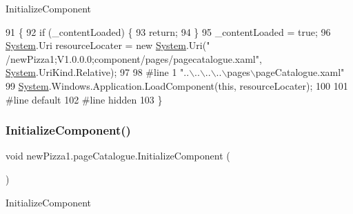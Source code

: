Initialize\+Component 


\begin{DoxyCode}
91                                           \{
92             \textcolor{keywordflow}{if} (\_contentLoaded) \{
93                 \textcolor{keywordflow}{return};
94             \}
95             \_contentLoaded = \textcolor{keyword}{true};
96             \hyperlink{namespaceSystem}{System}.Uri resourceLocater = \textcolor{keyword}{new} \hyperlink{namespaceSystem}{System}.Uri(\textcolor{stringliteral}{"
      /newPizza1;V1.0.0.0;component/pages/pagecatalogue.xaml"}, \hyperlink{namespaceSystem}{System}.UriKind.Relative);
97             
98 \textcolor{preprocessor}{            #line 1 "..\(\backslash\)..\(\backslash\)..\(\backslash\)..\(\backslash\)pages\(\backslash\)pageCatalogue.xaml"
}
99             \hyperlink{namespaceSystem}{System}.Windows.Application.LoadComponent(\textcolor{keyword}{this}, resourceLocater);
100             
101 \textcolor{preprocessor}{            #line default
}
102 \textcolor{preprocessor}{            #line hidden
}
103         \}
\end{DoxyCode}
\mbox{\label{classnewPizza1_1_1pageCatalogue_a43a8ad0ab6df5f89084c072525b49383}} 
\subsubsection{\texorpdfstring{Initialize\+Component()}{InitializeComponent()}\hspace{0.1cm}{\footnotesize\ttfamily [2/3]}}
{\footnotesize\ttfamily void new\+Pizza1.\+page\+Catalogue.\+Initialize\+Component (\begin{DoxyParamCaption}{ }\end{DoxyParamCaption})\hspace{0.3cm}{\ttfamily [inline]}}



Initialize\+Component 


